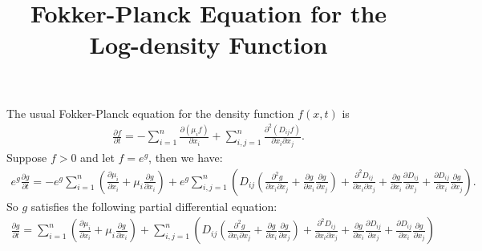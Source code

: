 \documentclass[10pt]{article}
\title{\vspace{-4ex}\textbf{Fokker-Planck Equation for the Log-density Function\vspace{-4ex}}}
\date{}
\begin{document}
\maketitle

The usual Fokker-Planck equation for the density function $f(x,t)$ is
\begin{align*}
	\frac{\partial f}{\partial t} = -\sum_{i=1}^n \frac{\partial (\mu_if)}{\partial x_i} + \sum_{i,j=1}^n \frac{\partial^2 (D_{ij}f)}{\partial x_i \partial x_j}.
\end{align*}
Suppose $f>0$ and let $f = e^g$, then we have:
\begin{align*}
	e^g \frac{\partial g}{\partial t} = -e^g \sum_{i=1}^n \left( \frac{\partial \mu_i}{\partial x_i} + \mu_i \frac{\partial g}{\partial x_i} \right) + e^g \sum_{i,j=1}^n \left( D_{ij}\left( \frac{\partial^2 g}{\partial x_i \partial x_j} + \frac{\partial g}{\partial x_i} \frac{\partial g}{\partial x_j} \right) + \frac{\partial^2 D_{ij}}{\partial x_i \partial x_j} + \frac{\partial g}{\partial x_i} \frac{\partial D_{ij}}{\partial x_j} + \frac{\partial D_{ij}}{\partial x_i} \frac{\partial g}{\partial x_j} \right).
\end{align*}
So $g$ satisfies the following partial differential equation:
\begin{align*}
	\frac{\partial g}{\partial t} = \sum_{i=1}^n \left( \frac{\partial \mu_i}{\partial x_i} + \mu_i \frac{\partial g}{\partial x_i} \right) + \sum_{i,j=1}^n \left( D_{ij}\left( \frac{\partial^2 g}{\partial x_i \partial x_j} + \frac{\partial g}{\partial x_i} \frac{\partial g}{\partial x_j} \right) + \frac{\partial^2 D_{ij}}{\partial x_i \partial x_j} + \frac{\partial g}{\partial x_i} \frac{\partial D_{ij}}{\partial x_j} + \frac{\partial D_{ij}}{\partial x_i} \frac{\partial g}{\partial x_j} \right)
\end{align*}
\end{document}
